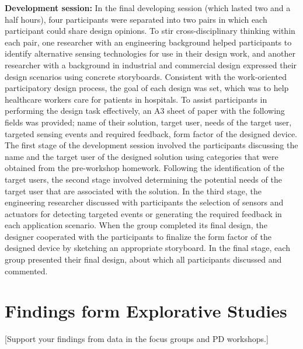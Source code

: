 \textbf{Development session:} 
\newline
In the final developing session (which lasted two and a half hours), four participants were separated into two pairs in which each participant could share design opinions. To stir cross-disciplinary thinking within each pair, one researcher with an engineering background helped participants to identify alternative sensing technologies for use in their design work, and another researcher with a background in industrial and commercial design expressed their design scenarios using concrete storyboards. Consistent with the work-oriented participatory design process, the goal of each design was set, which was to help healthcare workers care for patients in hospitals. To assist participants in performing the design task effectively, an A3 sheet of paper with the following fields was provided; name of their solution, target user, needs of the target user, targeted sensing events and required feedback, form factor of the designed device. The first stage of the development session involved the participants discussing the name and the target user of the designed solution using categories that were obtained from the pre-workshop homework. Following the identification of the target users, the second stage involved determining the potential needs of the target user that are associated with the solution. In the third stage, the engineering researcher discussed with participants the selection of sensors and actuators for detecting targeted events or generating the required feedback in each application scenario. When the group completed its final design, the designer cooperated with the participants to finalize the form factor of the designed device by sketching an appropriate storyboard. In the final stage, each group presented their final design, about which all participants discussed and commented.

\section{Findings form Explorative Studies}
[Support your findings from data in the focus groups and PD workshops.]

